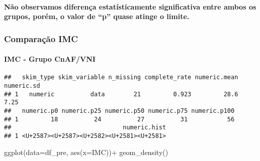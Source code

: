 \documentclass[
]{article}
\newenvironment{Shaded}{\begin{snugshade}}{\end{snugshade}}
\newcommand{\AttributeTok}[1]{\textcolor[rgb]{0.77,0.63,0.00}{#1}}
\newcommand{\FunctionTok}[1]{\textcolor[rgb]{0.00,0.00,0.00}{#1}}
\newcommand{\NormalTok}[1]{#1}
\newcommand{\SpecialCharTok}[1]{\textcolor[rgb]{0.00,0.00,0.00}{#1}}
\begin{document}
\hypertarget{nuxe3o-observamos-diferenuxe7a-estatuxedsticamente-significativa-entre-ambos-os-grupos-poruxe9m-o-valor-de-p-quase-atinge-o-limite.}{%
\paragraph{Não observamos diferença estatísticamente significativa entre
ambos os grupos, porém, o valor de ``p'' quase atinge o
limite.}\label{nuxe3o-observamos-diferenuxe7a-estatuxedsticamente-significativa-entre-ambos-os-grupos-poruxe9m-o-valor-de-p-quase-atinge-o-limite.}}

\hypertarget{comparauxe7uxe3o-imc}{%
\subsubsection{Comparação IMC}\label{comparauxe7uxe3o-imc}}

\hypertarget{imc---grupo-cnafvni}{%
\paragraph{\texorpdfstring{\textbf{IMC - Grupo
CnAF/VNI}}{IMC - Grupo CnAF/VNI}}\label{imc---grupo-cnafvni}}

\begin{Shaded}
\end{Shaded}

\begin{verbatim}
##   skim_type skim_variable n_missing complete_rate numeric.mean numeric.sd
## 1   numeric          data        21         0.923         28.6       7.25
##   numeric.p0 numeric.p25 numeric.p50 numeric.p75 numeric.p100
## 1         18          24          27          31           56
##                               numeric.hist
## 1 <U+2587><U+2587><U+2582><U+2581><U+2581>
\end{verbatim}

\begin{Shaded}
\begin{Highlighting}[]
\FunctionTok{ggplot}\NormalTok{(}\AttributeTok{data=}\NormalTok{df\_pre, }\FunctionTok{aes}\NormalTok{(}\AttributeTok{x=}\NormalTok{IMC))}\SpecialCharTok{+}
  \FunctionTok{geom\_density}\NormalTok{()}
\end{Highlighting}
\end{Shaded}
\end{document}
